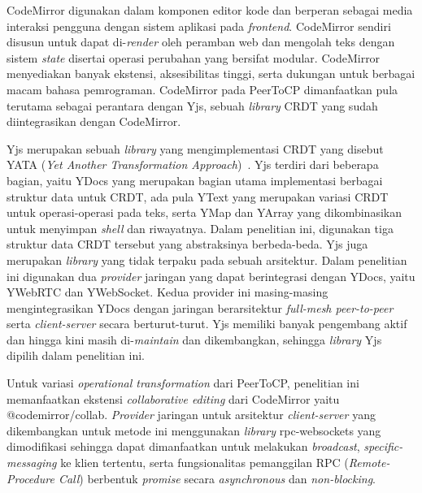 CodeMirror digunakan dalam komponen editor kode dan berperan sebagai media interaksi pengguna dengan sistem aplikasi pada \textit{frontend}. CodeMirror sendiri disusun untuk dapat di-\textit{render} oleh peramban web dan mengolah teks dengan sistem \textit{state} disertai operasi perubahan yang bersifat modular. CodeMirror menyediakan banyak ekstensi, aksesibilitas tinggi, serta dukungan untuk berbagai macam bahasa pemrograman. CodeMirror pada PeerToCP dimanfaatkan pula terutama sebagai perantara dengan Yjs, sebuah \textit{library} CRDT yang sudah diintegrasikan dengan CodeMirror.

Yjs merupakan sebuah \textit{library} yang mengimplementasi CRDT yang disebut YATA (\textit{Yet Another Transformation Approach})~\citep{Nicolaescu2016yjs}. Yjs terdiri dari beberapa bagian, yaitu YDocs yang merupakan bagian utama implementasi berbagai struktur data untuk CRDT, ada pula YText yang merupakan variasi CRDT untuk operasi-operasi pada teks, serta YMap dan YArray yang dikombinasikan untuk menyimpan \textit{shell} dan riwayatnya. Dalam penelitian ini, digunakan tiga struktur data CRDT tersebut yang abstraksinya berbeda-beda. Yjs juga merupakan \textit{library} yang tidak terpaku pada sebuah arsitektur. Dalam penelitian ini digunakan dua \textit{provider} jaringan yang dapat berintegrasi dengan YDocs, yaitu YWebRTC dan YWebSocket. Kedua provider ini masing-masing mengintegrasikan YDocs dengan jaringan berarsitektur \textit{full-mesh peer-to-peer} serta \textit{client-server} secara berturut-turut. Yjs memiliki banyak pengembang aktif dan hingga kini masih di-\textit{maintain} dan dikembangkan, sehingga \textit{library} Yjs dipilih dalam penelitian ini.

Untuk variasi \textit{operational transformation} dari PeerToCP, penelitian ini memanfaatkan ekstensi \textit{collaborative editing} dari CodeMirror yaitu @codemirror/collab. \textit{Provider} jaringan untuk arsitektur \textit{client-server} yang dikembangkan untuk metode ini menggunakan \textit{library} rpc-websockets yang dimodifikasi sehingga dapat dimanfaatkan untuk melakukan \textit{broadcast}, \textit{specific-messaging} ke klien tertentu, serta fungsionalitas pemanggilan RPC (\textit{Remote-Procedure Call}) berbentuk \textit{promise} secara \textit{asynchronous} dan \textit{non-blocking}.


